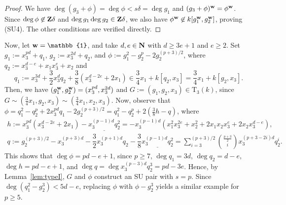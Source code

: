\documentclass{amsart}
\theoremstyle{plain}
\theoremstyle{definition}
\newcommand{\T }{\mathrm{T}}
\newcommand{\Z}{{\bf Z}}
\newcommand{\N}{{\bf N}}
\newcommand{\w}{{\bf w}}
\begin{document}
\begin{proof}
We have 
$\deg (g_3+\phi )=\deg \phi <s\delta =\deg g_1$ 
and $(g_3+\phi )^{\w }=\phi ^{\w }$. 
Since $\deg \phi \not\in \Z \delta $ and 
$\deg g_1\deg g_2\in \Z \delta $, 
we also have $\phi ^{\w }\not\in k[g_1^{\w },g_2^{\w }]$, 
proving (SU4). 
The other conditions are verified directly. 
\end{proof}





Now, 
let $\w =\mathbb{1}$, 
and take $d,e\in \N $ with $d\ge 3e+1$ and $e\ge 2$. 
Set $g_1:=x_3^{pd}+q_1$, 
$g_2:=x_3^{2d}+q_2$, 
and $\phi :=g_1^2-g_2^p-2g_2^{(p+3)/2}$, 
where $q_2:=x_3^{d-e}+x_1x_3^e+x_2$ and 
$$
q_1:=x_3^{3d}+\dfrac{3}{2}x_3^dq_2+\dfrac{3}{8}(x_3^{d-2e}+2x_1)
\in \dfrac{3}{4}x_1+k[q_2,x_3]=\dfrac{3}{4}x_1+k[g_2,x_3].
$$
Then, we have 
$(g_1^{\w },g_2^{\w })=(x_3^{pd},x_3^{2d})$ 
and 
$G:=(g_1,g_2,x_3)\in \T _3(k)$, since 
$G\sim (\frac{3}{4}x_1,g_2,x_3)\sim (\frac{3}{4}x_1,x_2,x_3)$. 
Now, observe that 
$\phi =q_1^2-q_2^p+2x_3^{pd}q_1-2g_2^{(p+3)/2}
=q_1^2-q_2^p+2(\frac{3}{8}h-q)$, 
where 
\begin{gather*}
h:=x_3^{pd}(x_3^{d-2e}+2x_1)-\underline{x_3^{(p-1)d}q_2^2}
=-x_3^{(p-1)d}(x_1^2x_3^{2e}+x_2^2+2x_1x_2x_3^e
+2x_2x_3^{d-e}), \\
q:=g_2^{(p+3)/2}
-x_3^{(p+3)d}-\dfrac{3}{2}x_3^{(p+1)d}q_2
-\dfrac{3}{8}\underline{x_3^{(p-1)d}q_2^2}
=\sum _{i=3}^{(p+3)/2}
\binom{\frac{p+3}{2}}{i}x_3^{(p+3-2i)d}q_2^i. 
\end{gather*}
This shows that $\deg \phi =pd-e+1$, 
since $p\ge 7$, 
$\deg q_1=3d$, $\deg q_2=d-e$, 
$\deg h=pd-e+1$, 
and 
$\deg q=\deg x_3^{(p-3)d}q_2^3=pd-3e$. 
Hence, by Lemma~\ref{lem:typeI}, 
$G$ and $\phi $ construct an SU pair with $s=p$. 
Since $\deg (q_1^2-g_2^3)<5d-e$, 
replacing $\phi $ with $\phi -g_2^3$ 
yields a similar example for $p\ge 5$. 
\end{document}
